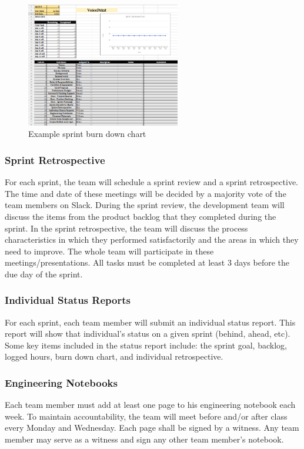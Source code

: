 \begin{figure}[h!]
	\centering
   	\includegraphics[width=0.6\textwidth]{images/Chart.png}
    \caption{Example sprint burn down chart}
\end{figure}

\newpage\subsubsection{Sprint Retrospective}
For each sprint, the team will schedule a sprint review and a sprint retrospective. The time and date of these meetings will be decided by a majority vote of the team members on Slack. During the sprint review, the development team will discuss the items from the product backlog that they completed during the sprint. In the sprint retrospective, the team will discuss the process characteristics in which they performed satisfactorily and the areas in which they need to improve. The whole team will participate in these meetings/presentations. All tasks must be completed at least 3 days before the due day of the sprint.

\subsubsection{Individual Status Reports}
For each sprint, each team member will submit an individual status report. This report will show that individual's status on a given sprint (behind, ahead, etc). Some key items included in the status report include: the sprint goal, backlog, logged hours, burn down chart, and individual retrospective.

\subsubsection{Engineering Notebooks}
Each team member must add at least one page to his engineering notebook each week. To maintain accountability, the team will meet before and/or after class every Monday and Wednesday. Each page shall be signed by a witness. Any team member may serve as a witness and sign any other team member's notebook.

